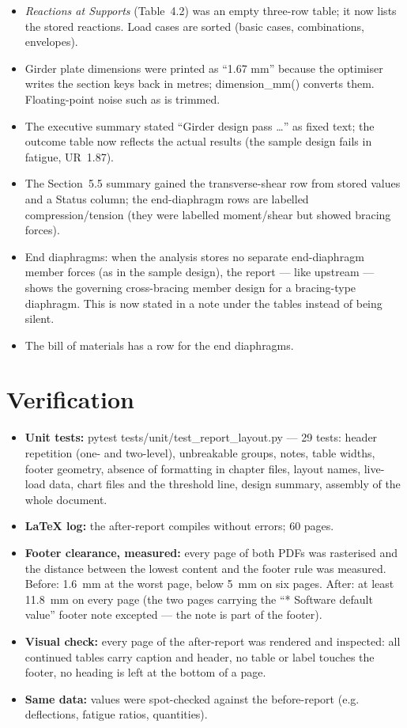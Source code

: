\documentclass[10pt,a4paper]{article}
\newcommand{\code}[1]{{\small\ttfamily #1}}
\begin{document}
\begin{itemize}
\item \emph{Reactions at Supports} (Table~4.2) was an empty three-row table; it now lists the stored reactions. Load cases are sorted (basic cases, combinations, envelopes).
\item Girder plate dimensions were printed as ``1.67 mm'' because the optimiser writes the section keys back in metres; \code{dimension\_mm()} converts them. Floating-point noise such as \code{11.399999999999999} is trimmed.
\item The executive summary stated ``Girder design pass \dots'' as fixed text; the outcome table now reflects the actual results (the sample design fails in fatigue, UR~1.87).
\item The Section~5.5 summary gained the transverse-shear row from stored values and a Status column; the end-diaphragm rows are labelled compression/tension (they were labelled moment/shear but showed bracing forces).
\item End diaphragms: when the analysis stores no separate end-diaphragm member forces (as in the sample design), the report --- like upstream --- shows the governing cross-bracing member design for a bracing-type diaphragm. This is now stated in a note under the tables instead of being silent.
\item The bill of materials has a row for the end diaphragms.
\end{itemize}

\section{Verification}

\begin{itemize}
\item \textbf{Unit tests:} \code{pytest tests/unit/test\_report\_layout.py} --- 29 tests: header repetition (one- and two-level), unbreakable groups, notes, table widths, footer geometry, absence of formatting in chapter files, layout names, live-load data, chart files and the threshold line, design summary, assembly of the whole document.
\item \textbf{LaTeX log:} the after-report compiles without errors; 60 pages.
\item \textbf{Footer clearance, measured:} every page of both PDFs was rasterised and the distance between the lowest content and the footer rule was measured. Before: 1.6~mm at the worst page, below 5~mm on six pages. After: at least 11.8~mm on every page (the two pages carrying the ``* Software default value'' footer note excepted --- the note is part of the footer).
\item \textbf{Visual check:} every page of the after-report was rendered and inspected: all continued tables carry caption and header, no table or label touches the footer, no heading is left at the bottom of a page.
\item \textbf{Same data:} values were spot-checked against the before-report (e.g. deflections, fatigue ratios, quantities).
\end{itemize}
\end{document}
